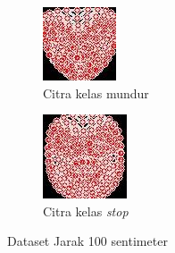 \begin{figure}[H]
  \begin{subfigure}{0.3\textwidth}
      \centering
      \includegraphics[width=\linewidth]{gambar/100 mundur.jpg}
      \caption{Citra kelas mundur}
      \label{fig:image4}
  \end{subfigure}
  \hfill
  \begin{subfigure}{0.3\textwidth}
      \centering
      \includegraphics[width=\linewidth]{gambar/100 stop.jpg}
      \caption{Citra kelas \emph{stop}}
      \label{fig:image5}
  \end{subfigure}
  \caption{Dataset Jarak 100 sentimeter}
  \label{fig:15lux}
\end{figure}

